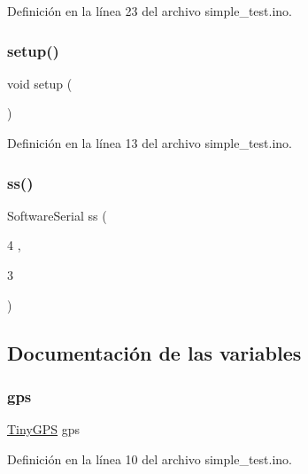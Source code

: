Definición en la línea 23 del archivo simple\+\_\+test.\+ino.

\mbox{\label{simple__test_8ino_a4fc01d736fe50cf5b977f755b675f11d}} 
\subsubsection{\texorpdfstring{setup()}{setup()}}
{\footnotesize\ttfamily void setup (\begin{DoxyParamCaption}{ }\end{DoxyParamCaption})}



Definición en la línea 13 del archivo simple\+\_\+test.\+ino.

\mbox{\label{simple__test_8ino_ad6146be3f2c4ff5ac64c90ef5d1b37b1}} 
\subsubsection{\texorpdfstring{ss()}{ss()}}
{\footnotesize\ttfamily Software\+Serial ss (\begin{DoxyParamCaption}\item[{4}]{,  }\item[{3}]{ }\end{DoxyParamCaption})}



\subsection{Documentación de las variables}
\mbox{\label{simple__test_8ino_a4e2f9a5d1b23f30f530101af71f72744}} 
\subsubsection{\texorpdfstring{gps}{gps}}
{\footnotesize\ttfamily \hyperlink{class_tiny_g_p_s}{Tiny\+G\+PS} gps}



Definición en la línea 10 del archivo simple\+\_\+test.\+ino.

